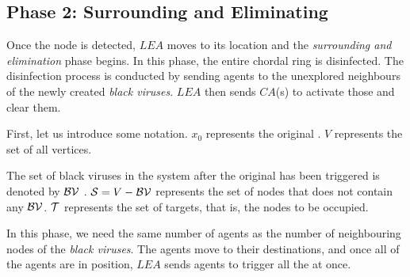 \subsection{Phase 2: Surrounding and Eliminating}
 
Once the \bv node is detected, $LEA$ moves to its location and the {\em surrounding and elimination} phase begins. In this phase, the entire chordal ring is disinfected. The disinfection process is conducted by sending agents to the unexplored neighbours of the newly created {\it black viruses}. $LEA$ then sends $CA$(s) to activate those \bvs and  clear them. 

 First, let us introduce some notation. $x_0$ represents the original \bv. $V$ represents  the set of all vertices. 

The set of black viruses in the system after the original \bv has been triggered is denoted by  ${\cal BV}$ .
${\cal S} = V - {\cal BV}$ represents the set of  nodes that does not contain any ${\cal BV}$. 
  ${\cal T}$ represents the set of targets, that is, the nodes to be occupied. 

  \begin{center}
\end{center}



 In this phase, we need the same number of agents as the number of neighbouring nodes of the {\it black viruses}. The agents move to their destinations, and once all of the agents are in position, $LEA$ sends agents to trigger all the \bvs at once. 


